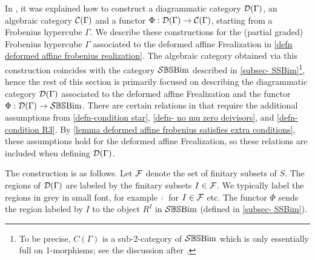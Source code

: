 In \cite{EWSFrob}, it was explained how to construct a diagrammatic category $\mathcal{D}(\Gamma)$, an algebraic category $\mathcal{C}(\Gamma)$ and a functor $\Phi: \mathcal{D}(\Gamma) \rightarrow \mathcal{C}(\Gamma)$, starting from a Frobenius hypercube $\Gamma$. We describe these constructions for the (partial graded) Frobenius hypercube $\Gamma$ associated to the deformed affine Frealization in \cref{defn deformed affine frobenius realization}. The algebraic category obtained via this construction coincides with the category $\mathcal{S}\mathbb{BS}\text{Bim}$ described in \cref{subsec- SSBim}\footnote{To be precise, $C(\Gamma)$ is a sub-2-category of $\mathcal{S}\mathbb{BS}\text{Bim}$ which is only essentially full on 1-morphisms; see the discussion after \cite[Definition 1.3]{EWSFrob}.}, hence the rest of this section is primarily focused on describing the diagrammatic category $\mathcal{D}(\Gamma)$ associated to the deformed affine Frealization and the functor $\Phi: \mathcal{D}(\Gamma) \rightarrow \mathcal{S}\mathbb{BS}\text{Bim}$. 
There are certain relations in \cite{EWSFrob} that require the additional assumptions from \cref{defn-condition star}, \cref{defn- no mu zero deivisors}, and \cref{defn-condition R3}. By \cref{lemma deformed affine frobenius satisfies extra conditions}, these assumptions hold for the deformed affine Frealization, so these relations  are included when defining $\mathcal{D}(\Gamma)$.

{



}

The construction is as follows.
Let $\mathcal{F}$ denote the set of finitary subsets of $S$.
The regions of $\mathcal{D}(\Gamma)$ are labeled by the finitary subsets $I \in \mathcal{F}$.
We typically label the regions in grey in small font, for example $\gr{I}$ for $I \in \mathcal{F}$ etc.
The functor $\Phi$ sends the region labeled by $I$ to the object $R^I$ in $\mathcal{S}\mathbb{BS}\text{Bim}$ (defined in \cref{subsec- SSBim}).

